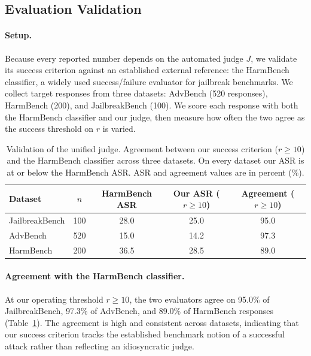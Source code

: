 \documentclass[a4paper,fleqn]{cas-sc}
\begin{document}
\subsection{Evaluation Validation}
\label{sec:validation}

\paragraph{Setup.}
Because every reported number depends on the automated judge $J$, we validate its success criterion against an established external reference: the HarmBench classifier, a widely used success/failure evaluator for jailbreak benchmarks.
We collect target responses from three datasets: AdvBench (520 responses), HarmBench (200), and JailbreakBench (100).
We score each response with both the HarmBench classifier and our judge, then measure how often the two agree as the success threshold on $r$ is varied.

\begin{table}[htbp]
  \centering
  \caption{Validation of the unified judge. Agreement between our success
    criterion ($r \ge 10$) and the HarmBench classifier across three datasets.
    On every dataset our ASR is at or below the HarmBench ASR. ASR and agreement values are in percent (\%).}
  \label{tab:judge_validation}
  \footnotesize
  \renewcommand{\arraystretch}{1.3}
  \setlength{\aboverulesep}{0pt}
  \setlength{\belowrulesep}{0pt}
  \begin{tabular}{lcccc}
    \toprule
    \textbf{Dataset} & {\bfseries\boldmath $n$} & \textbf{HarmBench ASR} & {\bfseries\boldmath Our ASR ($r\ge10$)} & {\bfseries\boldmath Agreement ($r\ge10$)} \\
    \midrule
    JailbreakBench   & 100                      & 28.0                   & 25.0                                    & 95.0                                      \\
    AdvBench         & 520                      & 15.0                   & 14.2                                    & 97.3                                      \\
    HarmBench        & 200                      & 36.5                   & 28.5                                    & 89.0                                      \\
    \bottomrule
  \end{tabular}
\end{table}

\paragraph{Agreement with the HarmBench classifier.}
At our operating threshold $r \ge 10$, the two evaluators agree on 95.0\% of JailbreakBench, 97.3\% of AdvBench, and 89.0\% of HarmBench responses (Table~\ref{tab:judge_validation}).
The agreement is high and consistent across datasets, indicating that our success criterion tracks the established benchmark notion of a successful attack rather than reflecting an idiosyncratic judge.
\end{document}
